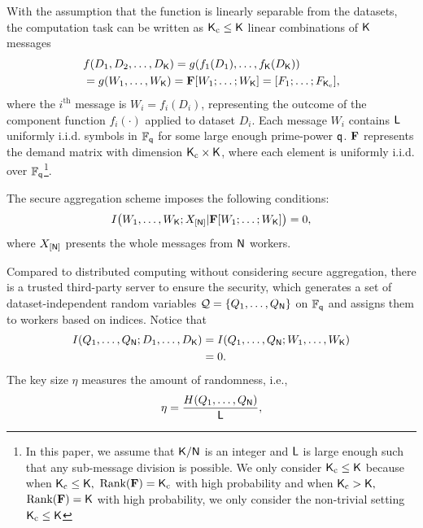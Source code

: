 \documentclass[conference,letterpaper]{IEEEtran}
\begin{document}
With the assumption that the function is linearly separable from the datasets, the computation task can be written as ${\sf K}_{\rm c}\leq {\sf K}$ linear combinations of ${\sf K}$ messages
\begin{align}
    &f({D_1},{D_2}, \ldots ,{D_{{\sf K}}}) = g({f_1}({D_1}), \ldots ,{f_{{\sf K}}}({D_{{\sf K}}}))  \nonumber\\
    &= g({W_1}, \ldots ,{W_{{\sf K}}}) = {\bf F}[{W_1}; \ldots ;{W_{\sf K}}] = [{F_1};\ldots;{F_{{\sf K}_{\rm c}}}], \label{eq:computation task}
\end{align}
where the $i^{\text{th}}$ message is  ${W_i} = {f_i}({D_i}) $, representing  the outcome of the  component function $f_i(\cdot)$ applied to dataset $D_i$. Each message $W_i$ contains ${\sf L}$ uniformly i.i.d. symbols in $\mathbb{F}_{{\sf q}}$ for some large enough prime-power ${\sf q}$. ${\bf F}$ represents the demand matrix with dimension ${\sf K}_{\rm c} \times {\sf K}$, where each element is uniformly i.i.d. over $\mathbb{F}_{{\sf q}}$\footnote{\label{foot:L large}In this paper, we assume that  ${\sf K}/{\sf N}$ is an integer and  ${\sf L}$ is large enough such
that any sub-message division is possible. We only consider ${\sf K}_{\rm c} \leq {\sf K}$ because when ${\sf K}_{\rm c} \le {\sf K},$  $\text{Rank}({\bf F}) = {\sf K}_{\rm c}$ with high probability and when ${\sf K}_{\rm c} > {\sf K},$ $\text{Rank}({\bf F}) = {\sf K}$ with high probability, we only consider the non-trivial setting ${\sf K}_{\rm c} \le {\sf K}$}. 

The secure aggregation scheme imposes the following conditions: 
\begin{align}
    I\big(W_{1},\ldots, W_{{\sf K}};   X_{[{\sf N}]} | {\bf F}   [W_1;\ldots;W_{{\sf K}}]  \big)=0,
\end{align}
where $X_{[{\sf N}]}$ presents the whole messages from ${\sf N}$ workers.

Compared to distributed computing without considering secure aggregation, there is a trusted third-party server to ensure the security, which generates a set of dataset-independent random variables ${\cal Q} = \{Q_{1}, \ldots, Q_{{\sf N}}\}$ on $\mathbb{F}_{{\sf q}}$ and assigns them to workers based on indices. Notice that   
\begin{align}
I(Q_1, \ldots, Q_{{\sf N}} ; D_1, \ldots, D_{{\sf K}} )&=I(Q_1, \ldots, Q_{{\sf N}} ; W_1, \ldots, W_{{\sf K}} ) \nonumber\\ 
&=0. \label{eq:independent key}
\end{align}
The key size \( \eta \) measures the amount of randomness, i.e.,
\begin{align}
\eta = \frac{H( Q_1, \ldots, Q_{{\sf N}} )}{{\sf L}}, \label{eq:def of eta}
\end{align}
\end{document}

